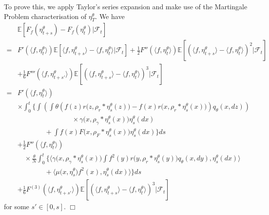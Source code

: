 \documentclass[12pt]{article}
\newenvironment {proof}{{\noindent\bf Proof }}{\hfill $\Box$ \medskip}
\begin{document}
\begin{proof}
To prove this,
we apply Taylor's series expansion
and make use of the Martingale Problem characterisation
of $\eta^{\theta}_T$.
We have
\begin{equation}
\begin{aligned}
&\mathbb{E}\left[F_f(\eta^{\theta}_{t+s})-F_f(\eta^{\theta}_t)\bigg| \mathcal{F}_t \right]\\
=& F'(\langle f, \eta^{\theta}_t \rangle )
\mathbb{E}\left[
                \langle f, \eta^{\theta}_{t+s}\rangle
                    -\langle f, \eta^{\theta}_t\rangle 
                    \bigg| \mathcal{F}_t
         \right]
+\frac{1}{2}F''(\langle f, \eta^{\theta}_t \rangle )
\mathbb{E}\left[
                \left(
                    \langle f, \eta^{\theta}_{t+s}\rangle -\langle f, \eta^{\theta}_t\rangle
                \right)^2
                \bigg| \mathcal{F}_t
        \right]\\
&+\frac{1}{6}F'''(\langle f, \eta^{\theta}_{t+s'}\rangle)\mathbb{E}\left[
                \left(
                    \langle f, \eta^{\theta}_{t+s}\rangle -\langle f, \eta^{\theta}_t\rangle
                \right)^3
                \bigg| \mathcal{F}_t
        \right]\\
=& F'(\langle f, \eta^{\theta}_t \rangle )\\
& \times  \int_{0}^{t}\bigg\{
        \int\left(   \int \theta
     \left(
        f(z)r\big(z,\rho_{r}*\eta^{\theta}_{s}(z)\big)
            -f(x)r\big(x,\rho_{r}*\eta^{\theta}_{s}(x)\big)
            \right)
                    q_\theta(x,dz)\right)
        \\ & \qquad \qquad \qquad \qquad {} \times
                            \gamma\big(x,\rho_{\gamma}*\eta^{\theta}_{s}(x)\big)
                            \eta^{\theta}_{s}(dx)
     \\ & \qquad \qquad {} +\int 
     f(x)F\big(x,\rho_{F}*\eta^{\theta}_{s}(x)\big)
     \eta^{\theta}_{s}(dx)
    \bigg\} ds\\
&+\frac{1}{2}F''(\langle f, \eta^{\theta}_t \rangle )\\
&\quad \times \frac{\theta}{N} \int_{0}^{t}\bigg\{
\langle \gamma\big(x,\rho_{\gamma}*\eta^{\theta}_{s}(x)\big)
\int f^2(y)r\big(y,\rho_{r}*\eta^{\theta}_{s}(y)\big)q_\theta(x,dy) 
,\eta^{\theta}_{s}(dx)\rangle\\
& \qquad \qquad +\langle \mu\big(x,\eta^{\theta}_{s}\big)f^2(x) 
,\eta^{\theta}_{s}(dx)\rangle \bigg\}ds\\
&+\frac{1}{6}F^{(3)}(\langle f, \eta^{\theta}_{t+s'}\rangle)\mathbb{E}\left[
                \left(
                    \langle f, \eta^{\theta}_{t+s}\rangle -\langle f, \eta^{\theta}_t\rangle
                \right)^3
                \bigg| \mathcal{F}_t
        \right]
\end{aligned}
\end{equation}
for some $s' \in [0,s]$.
\end{proof}
\end{document}
